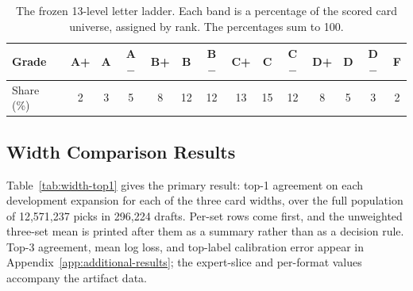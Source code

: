 \documentclass[11pt]{article}
\numberwithin{equation}{section}
\begin{document}
\begin{table}[tb]
\centering
\caption{The frozen 13-level letter ladder. Each band is a percentage of the
scored card universe, assigned by rank. The percentages sum to 100.}
\label{tab:letter-ladder}
{\small
\setlength{\tabcolsep}{4.5pt}
\begin{tabular}{lccccccccccccc}
\toprule
Grade & A+ & A & A$-$ & B+ & B & B$-$ & C+ & C & C$-$ & D+ & D & D$-$ & F \\
\midrule
Share (\%) & 2 & 3 & 5 & 8 & 12 & 12 & 13 & 15 & 12 & 8 & 5 & 3 & 2 \\
\bottomrule
\end{tabular}
}
\end{table}

\subsection{Width Comparison Results}
\label{sec:development-results}
\label{sec:whole-expansion-results}

Table~\ref{tab:width-top1} gives the primary result: top-1 agreement on each
development expansion for each of the three card widths, over the full
population of 12,571,237 picks in 296,224 drafts. Per-set rows come first, and
the unweighted three-set mean is printed after them as a summary rather than as
a decision rule. Top-3 agreement, mean log loss, and top-label calibration
error appear in Appendix~\ref{app:additional-results}; the expert-slice and
per-format values accompany the artifact data.
\end{document}
